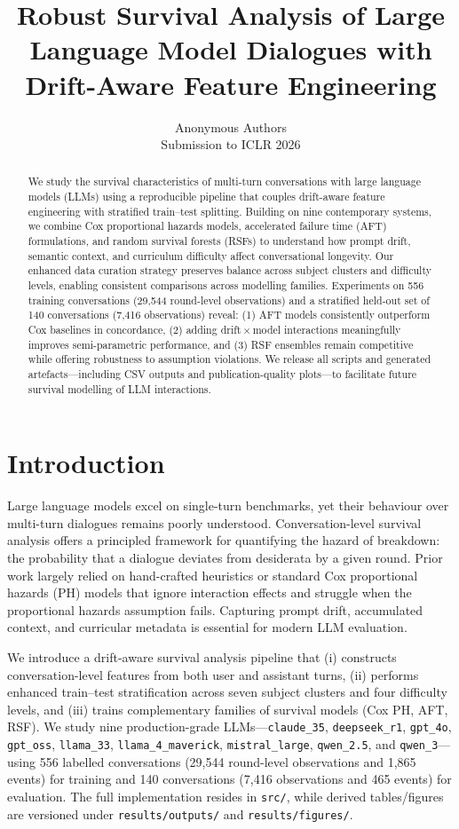 ﻿\documentclass{article}
\title{Robust Survival Analysis of Large Language Model Dialogues with Drift-Aware Feature Engineering}
\author{Anonymous Authors\\Submission to ICLR 2026}
\begin{document}
\maketitle
\begin{abstract}
We study the survival characteristics of multi-turn conversations with large language models (LLMs) using a reproducible pipeline that couples drift-aware feature engineering with stratified train--test splitting. Building on nine contemporary systems, we combine Cox proportional hazards models, accelerated failure time (AFT) formulations, and random survival forests (RSFs) to understand how prompt drift, semantic context, and curriculum difficulty affect conversational longevity. Our enhanced data curation strategy preserves balance across subject clusters and difficulty levels, enabling consistent comparisons across modelling families. Experiments on 556 training conversations (29,544 round-level observations) and a stratified held-out set of 140 conversations (7,416 observations) reveal: (1) AFT models consistently outperform Cox baselines in concordance, (2) adding drift\,$\times$\,model interactions meaningfully improves semi-parametric performance, and (3) RSF ensembles remain competitive while offering robustness to assumption violations. We release all scripts and generated artefacts---including CSV outputs and publication-quality plots---to facilitate future survival modelling of LLM interactions.
\end{abstract}

\section{Introduction}
Large language models excel on single-turn benchmarks, yet their behaviour over multi-turn dialogues remains poorly understood. Conversation-level survival analysis offers a principled framework for quantifying the hazard of breakdown: the probability that a dialogue deviates from desiderata by a given round. Prior work largely relied on hand-crafted heuristics or standard Cox proportional hazards (PH) models that ignore interaction effects and struggle when the proportional hazards assumption fails. Capturing prompt drift, accumulated context, and curricular metadata is essential for modern LLM evaluation.

We introduce a drift-aware survival analysis pipeline that (i) constructs conversation-level features from both user and assistant turns, (ii) performs enhanced train--test stratification across seven subject clusters and four difficulty levels, and (iii) trains complementary families of survival models (Cox PH, AFT, RSF). We study nine production-grade LLMs---\texttt{claude\_35}, \texttt{deepseek\_r1}, \texttt{gpt\_4o}, \texttt{gpt\_oss}, \texttt{llama\_33}, \texttt{llama\_4\_maverick}, \texttt{mistral\_large}, \texttt{qwen\_2.5}, and \texttt{qwen\_3}---using 556 labelled conversations (29,544 round-level observations and 1,865 events) for training and 140 conversations (7,416 observations and 465 events) for evaluation. The full implementation resides in \texttt{src/}, while derived tables/figures are versioned under \texttt{results/outputs/} and \texttt{results/figures/}.
\end{document}
